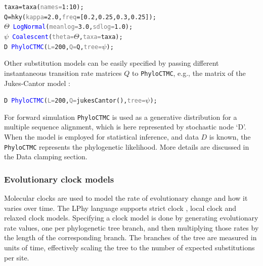 \documentclass[10pt,letterpaper,table]{article}
\theoremstyle{definition}
\begin{document}
{
  \small
  \begin{listing}
    \begin{alltt}
    taxa = \textcolor{generator}{taxa}(\textcolor{gray}{names=}\textcolor{constant}{1}:\textcolor{constant}{10});
    Q = \textcolor{generator}{hky}(\textcolor{gray}{kappa}=\textcolor{constant}{2.0}, \textcolor{gray}{freq}=[\textcolor{constant}{0.2}, \textcolor{constant}{0.25}, \textcolor{constant}{0.3}, \textcolor{constant}{0.25}]);
    \textcolor{bluishgreen}{\(\Theta\)} ~ \textcolor{blue}{LogNormal}(\textcolor{gray}{meanlog=}\textcolor{constant}{3.0}, \textcolor{gray}{sdlog=}\textcolor{constant}{1.0});
    \textcolor{bluishgreen}{\(\psi\)} ~ \textcolor{blue}{Coalescent}(\textcolor{gray}{theta=}\textcolor{bluishgreen}{\(\Theta\)}, \textcolor{gray}{taxa=}taxa);
    \textcolor{bluishgreen}{D} ~ \textcolor{blue}{PhyloCTMC}(\textcolor{gray}{L=}\textcolor{constant}{200}, \textcolor{gray}{Q=}Q, \textcolor{gray}{tree=}\textcolor{bluishgreen}{\(\psi\)});
    \end{alltt}
  \end{listing}
}

Other substitution models can be easily specified by passing different instantaneous transition rate matrices $Q$ to \texttt{PhyloCTMC}, e.g., the matrix of the Jukes-Cantor model \cite{jc69}:
{
  \small
  \begin{listing}
    \begin{alltt}
    \textcolor{bluishgreen}{D} ~ \textcolor{blue}{PhyloCTMC}(\textcolor{gray}{L=}\textcolor{constant}{200}, \textcolor{gray}{Q=}\textcolor{generator}{jukesCantor}(), \textcolor{gray}{tree=}\textcolor{bluishgreen}{\(\psi\)});
    \end{alltt}
  \end{listing}
}

For forward simulation \texttt{PhyloCTMC} is used as a generative distribution for a multiple sequence alignment, which is here represented by stochastic node `D'. When the model is employed for statistical inference, and data $D$ is known, the \texttt{PhyloCTMC} represents the phylogenetic likelihood. 
More details are discussed in the Data clamping section.

\subsubsection{Evolutionary clock models}
\label{sec:clockmodels}

Molecular clocks are used to model the rate of evolutionary change and how it varies over time. 
The LPhy language supports strict clock \cite{zuckerkandl1965evolutionary, zuckerkandl1965molecules}, local clock \cite{drummond2010bayesian} and relaxed clock \cite{drummond2006relaxedconfidence} models. 
Specifying a clock model is done by generating evolutionary rate values, one per phylogenetic tree branch, and then multiplying those rates by the length of the corresponding branch. 
The branches of the tree are measured in units of time, effectively scaling the tree to the number of expected substitutions per site. 
\end{document}
